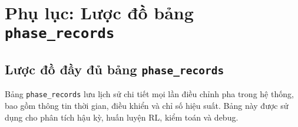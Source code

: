 
\chapter{Phụ lục: Lược đồ bảng \texttt{phase\_records}}

\section*{Lược đồ đầy đủ bảng \texttt{phase\_records}}
\label{app:phase_records_full}

Bảng \texttt{phase\_records} lưu lịch sử chi tiết mọi lần điều chỉnh pha trong hệ thống, bao gồm thông tin thời gian, điều khiển và chỉ số hiệu suất. Bảng này được sử dụng cho phân tích hậu kỳ, huấn luyện RL, kiểm toán và debug.

